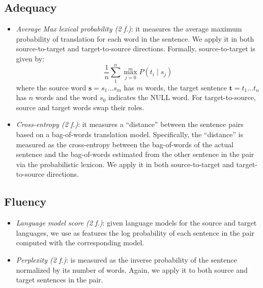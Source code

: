 \documentclass[a0]{sciposter}
\begin{document}
\begin{multicols*}{2}
\subsection{Adequacy} 
\begin{itemize}
  \item \textit{Average Max lexical probability (2 f.)}: it measures the average maximum probability of translation for each word in the sentence. We apply it in both source-to-target and target-to-source directions. Formally, source-to-target is given by:
  $$ \frac{1}{n}\sum_1^n\max_{j=0}^m P(t_i\mid s_j) $$
  where the source word $\mathbf{s}=s_1\ldots s_m$ has $m$ words, the target sentence $\mathbf{t}=t_1\ldots t_n$ has $n$ words and the word $s_0$ indicates the NULL word. For target-to-source, source and target words swap their roles.
  \item \textit{Cross-entropy (2 f.)}: it measures a ``distance'' between the sentence pairs based on a bag-of-words translation model. Specifically, the ``distance'' is measured as the cross-entropy between the bag-of-words of the actual sentence and the bag-of-words estimated from the other sentence in the pair via the probabilistic lexicon. We apply it in both source-to-target and target-to-source directions.
\end{itemize}

\subsection{Fluency} 
\begin{itemize}
  \item \textit{Language model score (2 f.)}: given language models for the source and target languages, we use as features the log probability of each sentence in the pair computed with the corresponding model.
  \item \textit{Perplexity (2 f.)}: is measured as the inverse probability of the sentence normalized by its number of words. Again, we apply it to both source and target sentences in the pair.
\end{itemize}


\end{multicols*}
\end{document}
